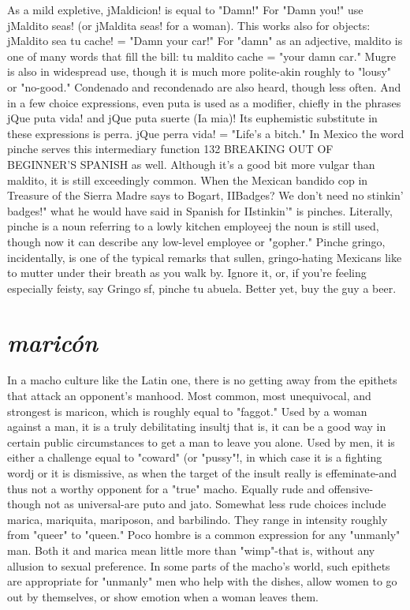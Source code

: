 As a mild expletive, jMaldicion! is equal to "Damn!" For
"Damn you!" use jMaldito seas! (or jMaldita seas! for a woman). This
works also for objects: jMaldito sea tu cache! = "Damn your car!" For
"damn" as an adjective, maldito is one of many words that fill the bill:
tu maldito cache = "your damn car." Mugre is also in widespread use,
though it is much more polite-akin roughly to "lousy" or "no-good."
Condenado and recondenado are also heard, though less often. And in
a few choice expressions, even puta is used as a modifier, chiefly in the
phrases jQue puta vida! and jQue puta suerte (Ia mia)! Its euphemistic substitute in these expressions is perra. jQue perra vida! = "Life's
a bitch."
In Mexico the word pinche serves this intermediary function
132 BREAKING OUT OF BEGINNER'S SPANISH
as well. Although it's a good bit more vulgar than maldito, it is still
exceedingly common. When the Mexican bandido cop in Treasure of
the Sierra Madre says to Bogart, IIBadges? We don't need no stinkin'
badges!" what he would have said in Spanish for IIstinkin'" is pinches.
Literally, pinche is a noun referring to a lowly kitchen employeej the
noun is still used, though now it can describe any low-level employee
or "gopher." Pinche gringo, incidentally, is one of the typical remarks
that sullen, gringo-hating Mexicans like to mutter under their breath
as you walk by. Ignore it, or, if you're feeling especially feisty, say
Gringo sf, pinche tu abuela. Better yet, buy the guy a beer.

\section{\emph{maricón}}

In a macho culture like the Latin one, there is no getting away
from the epithets that attack an opponent's manhood. Most common,
most unequivocal, and strongest is maricon, which is roughly equal to
"faggot." Used by a woman against a man, it is a truly debilitating insultj that is, it can be a good way in certain public circumstances to get
a man to leave you alone. Used by men, it is either a challenge equal to
"coward" (or "pussy"!, in which case it is a fighting wordj or it is dismissive, as when the target of the insult really is effeminate-and thus
not a worthy opponent for a "true" macho. Equally rude and offensive-though not as universal-are puto and jato. Somewhat less rude
choices include marica, mariquita, mariposon, and barbilindo. They
range in intensity roughly from "queer" to "queen." Poco hombre is a
common expression for any "unmanly" man. Both it and marica mean
little more than "wimp"-that is, without any allusion to sexual preference. In some parts of the macho's world, such epithets are appropriate for "unmanly" men who help with the dishes, allow women to go
out by themselves, or show emotion when a woman leaves them.

